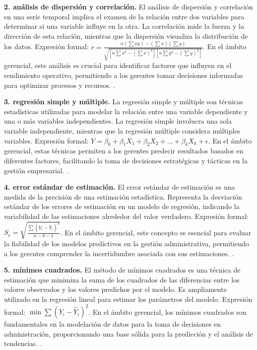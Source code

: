 {\textbf{2. análisis de dispersión y correlación.} El análisis de dispersión y correlación en una serie temporal implica el examen de la relación entre dos variables para determinar si una variable influye en la otra. La correlación mide la fuerza y la dirección de esta relación, mientras que la dispersión visualiza la distribución de los datos. Expresión formal: $r = \frac{n(\sum xy) - (\sum x)(\sum y)}{\sqrt{[n\sum x^2 - (\sum x)^2][n\sum y^2 - (\sum y)^2]}}$. En el ámbito gerencial, este análisis es crucial para identificar factores que influyen en el rendimiento operativo, permitiendo a los gerentes tomar decisiones informadas para optimizar procesos y recursos. \citep{anderson2012,lind2012,wackerly2010}.

\textbf{3. regresión simple y múltiple.} La regresión simple y múltiple son técnicas estadísticas utilizadas para modelar la relación entre una variable dependiente y una o más variables independientes. La regresión simple involucra una sola variable independiente, mientras que la regresión múltiple considera múltiples variables. Expresión formal: $Y = \beta_0 + \beta_1X_1 + \beta_2X_2 +... + \beta_kX_k + \epsilon$. En el ámbito gerencial, estas técnicas permiten a los gerentes predecir resultados basados en diferentes factores, facilitando la toma de decisiones estratégicas y tácticas en la gestión empresarial. \citep{anderson2012,lind2012,wackerly2010}.

\textbf{4. error estándar de estimación.} El error estándar de estimación es una medida de la precisión de una estimación estadística. Representa la desviación estándar de los errores de estimación en un modelo de regresión, indicando la variabilidad de las estimaciones alrededor del valor verdadero. Expresión formal: $S_e = \sqrt{\frac{\sum (Y_i - \hat{Y}_i)^2}{n-k-1}}$. En el ámbito gerencial, este concepto es esencial para evaluar la fiabilidad de los modelos predictivos en la gestión administrativa, permitiendo a los gerentes comprender la incertidumbre asociada con sus estimaciones. \citep{anderson2012,lind2012,wackerly2010}.

\textbf{5. mínimos cuadrados.} El método de mínimos cuadrados es una técnica de estimación que minimiza la suma de los cuadrados de las diferencias entre los valores observados y los valores predichos por el modelo. Es ampliamente utilizado en la regresión lineal para estimar los parámetros del modelo. Expresión formal: $\min \sum (Y_i - \hat{Y}_i)^2$. En el ámbito gerencial, los mínimos cuadrados son fundamentales en la modelación de datos para la toma de decisiones en administración, proporcionando una base sólida para la predicción y el análisis de tendencias. \citep{anderson2012,lind2012,wackerly2010}.

}
